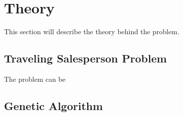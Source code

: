 
\chapter{Theory}
This section will describe the theory behind the problem.

\section{Traveling Salesperson Problem}
The problem can be
\section{Genetic Algorithm}